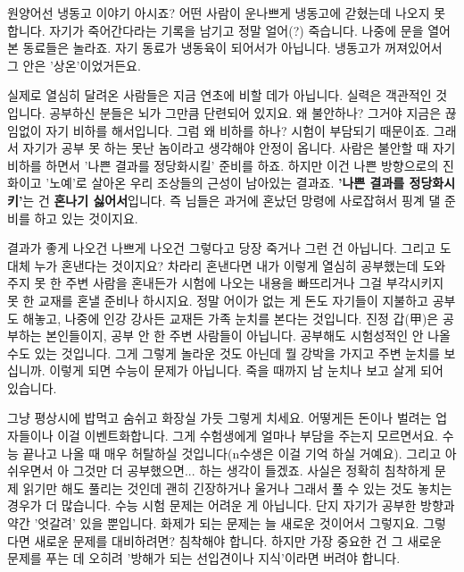 원양어선 냉동고 이야기 아시죠?
어떤 사람이 운나쁘게 냉동고에 갇혔는데 나오지 못 합니다.
자기가 죽어간다라는 기록을 남기고 정말 얼어(?) 죽습니다.
나중에 문을 열어본 동료들은 놀라죠.
자기 동료가 냉동육이 되어서가 아닙니다.
냉동고가 꺼져있어서 그 안은 '상온'이었거든요.
\vspace{5mm}

실제로 열심히 달려온 사람들은 지금 연초에 비할 데가 아닙니다.
실력은 객관적인 것입니다. 공부하신 분들은 뇌가 그만큼 단련되어 있지요.
왜 불안하나? 그거야 지금은 끊임없이 자기 비하를 해서입니다.
그럼 왜 비하를 하나? 시험이 부담되기 때문이죠. 그래서 자기가 공부 못 하는 못난 놈이라고 생각해야 안정이 옵니다.
사람은 불안할 때 자기 비하를 하면서 '나쁜 결과를 정당화시킬' 준비를 하죠.
하지만 이건 나쁜 방향으로의 진화이고 '노예'로 살아온 우리 조상들의 근성이 남아있는 결과죠.
\textbf{'나쁜 결과를 정당화시키'}는 건 \textbf{혼나기 싫어서}입니다. 즉 님들은 과거에 혼났던 망령에 사로잡혀서 핑계 댈 준비를 하고 있는 것이지요.
\vspace{5mm}

결과가 좋게 나오건 나쁘게 나오건 그렇다고 당장 죽거나 그런 건 아닙니다. 그리고 도대체 누가 혼낸다는 것이지요?
차라리 혼낸다면 내가 이렇게 열심히 공부했는데 도와주지 못 한 주변 사람을 혼내든가
시험에 나오는 내용을 빠뜨리거나 그걸 부각시키지 못 한 교재를 혼낼 준비나 하시지요.
정말 어이가 없는 게 돈도 자기들이 지불하고 공부도 해놓고, 나중에 인강 강사든 교재든 가족 눈치를 본다는 것입니다.
진정 갑(甲)은 공부하는 본인들이지, 공부 안 한 주변 사람들이 아닙니다.
공부해도 시험성적인 안 나올 수도 있는 것입니다. 그게 그렇게 놀라운 것도 아닌데 뭘 강박을 가지고 주변 눈치를 보십니까.
이렇게 되면 수능이 문제가 아닙니다. 죽을 때까지 남 눈치나 보고 살게 되어 있습니다.
\vspace{5mm}

그냥 평상시에 밥먹고 숨쉬고 화장실 가듯 그렇게 치세요.
어떻게든 돈이나 벌려는 업자들이나 이걸 이벤트화합니다. 그게 수험생에게 얼마나 부담을 주는지 모르면서요.
수능 끝나고 나올 때 매우 허탈하실 것입니다(n수생은 이걸 기억 하실 거예요). 그리고 아쉬우면서 아 그것만 더 공부했으면... 하는 생각이 들겠죠.
사실은 정확히 침착하게 문제 읽기만 해도 풀리는 것인데 괜히 긴장하거나 울거나 그래서 풀 수 있는 것도 놓치는 경우가 더 많습니다.
수능 시험 문제는 어려운 게 아닙니다. 단지 자기가 공부한 방향과 약간 '엇갈려' 있을 뿐입니다.
화제가 되는 문제는 늘 새로운 것이어서 그렇지요. 그렇다면 새로운 문제를 대비하려면? 침착해야 합니다.
하지만 가장 중요한 건 그 새로운 문제를 푸는 데 오히려 '방해가 되는 선입견이나 지식'이라면 버려야 합니다.
\vspace{5mm}

